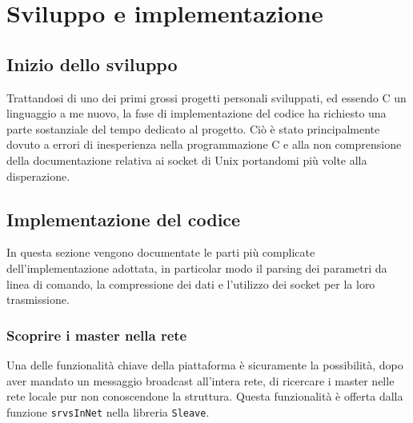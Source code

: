 \documentclass[11pt,fleqn]{book} %
\begin{document}

\chapter{Sviluppo e implementazione}

\section{Inizio dello sviluppo}
Trattandosi di uno dei primi grossi progetti personali sviluppati, ed essendo C un linguaggio a me nuovo, la fase di implementazione del codice ha richiesto una parte sostanziale del tempo dedicato al progetto.
Ciò è stato principalmente dovuto a errori di inesperienza nella programmazione C e alla non comprensione della documentazione relativa ai socket di Unix portandomi più volte alla disperazione.


\section{Implementazione del codice}
In questa sezione vengono documentate le parti più complicate dell'implementazione adottata, in particolar modo il parsing dei parametri da linea di comando, la compressione dei dati e l'utilizzo dei socket per la loro trasmissione.

\subsection{Scoprire i master nella rete}
Una delle funzionalità chiave della piattaforma è sicuramente la possibilità, dopo aver mandato un messaggio broadcast all'intera rete, di ricercare i master nelle rete locale pur non conoscendone la struttura. Questa funzionalità è offerta dalla funzione \texttt{srvsInNet} nella libreria \texttt{Sleave}.
\end{document}
